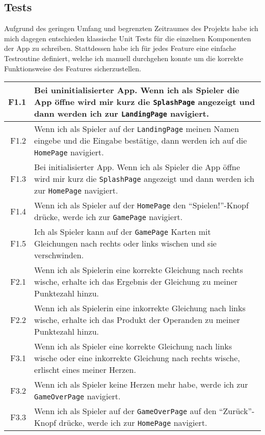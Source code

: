 \subsection{Tests}

Aufgrund des geringen Umfang und begrenzten Zeitraumes des Projekts habe ich mich dagegen entschieden klassische Unit Tests für die einzelnen Komponenten der App zu schreiben.
Stattdessen habe ich für jedes Feature eine einfache Testroutine definiert, welche ich manuell durchgehen konnte um die korrekte Funktionsweise des Features sicherzustellen.

\begin{longtabu}{| >{\ttfamily} r | X |}
  \hline
  F1.1 & Bei uninitialisierter App. Wenn ich als Spieler die App öffne wird mir kurz die \texttt{SplashPage} angezeigt und dann werden ich zur \texttt{LandingPage} navigiert. \\
  \hline
  F1.2 & Wenn ich als Spieler auf der \texttt{LandingPage} meinen Namen eingebe und die Eingabe bestätige, dann werden ich auf die \texttt{HomePage} navigiert. \\
  \hline
  F1.3 & Bei initialisierter App. Wenn ich als Spieler die App öffne wird mir kurz die \texttt{SplashPage} angezeigt und dann werden ich zur \texttt{HomePage} navigiert. \\
  \hline
  F1.4 & Wenn ich als Spieler auf der \texttt{HomePage} den \enquote{Spielen!}-Knopf drücke, werde ich zur \texttt{GamePage} navigiert.\\
  \hline
  F1.5 & Ich als Spieler kann auf der \texttt{GamePage} Karten mit Gleichungen nach rechts oder links wischen und sie verschwinden.\\
  \hline
  F2.1 & Wenn ich als Spielerin eine korrekte Gleichung nach rechts wische, erhalte ich das Ergebnis der Gleichung zu meiner Punktezahl hinzu.\\
  \hline
  F2.2 & Wenn ich als Spielerin eine inkorrekte Gleichung nach links wische, erhalte ich das Produkt der Operanden zu meiner Punktezahl hinzu.\\
  \hline
  F3.1 & Wenn ich als Spieler eine korrekte Gleichung nach links wische oder eine inkorrekte Gleichung nach rechts wische, erlischt eines meiner Herzen.\\
  \hline
  F3.2 & Wenn ich als Spieler keine Herzen mehr habe, werde ich zur \texttt{GameOverPage} navigiert.\\
  \hline
  F3.3 & Wenn ich als Spieler auf der \texttt{GameOverPage} auf den \enquote{Zurück}-Knopf drücke, werde ich zur \texttt{HomePage} navigiert.\\

\end{longtabu}
